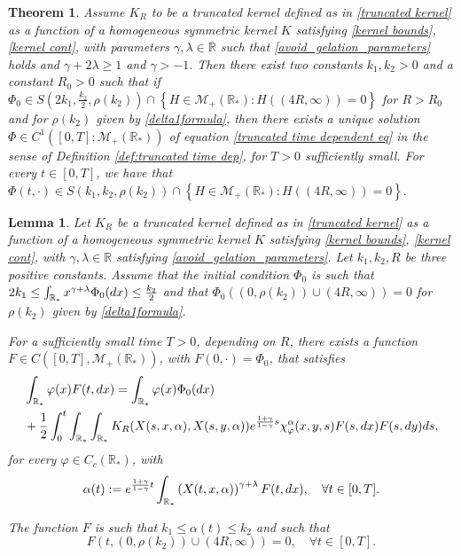 \documentclass[10pt,a4paper]{amsart}
\newtheorem{theorem}{Theorem}
\newtheorem{lemma}{Lemma}
\newcommand{\der}{\textup{d}}
\begin{document}
\begin{theorem}\label{thm:time dep truncated}
Assume $K_{R}$ to be a truncated kernel defined as in \eqref{truncated kernel} as a function of a homogeneous symmetric kernel $K$ satisfying \eqref{kernel bounds},  \eqref{kernel cont},  with parameters $\gamma, \lambda \in \mathbb R$ such that \eqref{avoid_gelation_parameters} holds and $\gamma + 2\lambda \geq 1 $ and $\gamma > -1.$ 
Then there exist two constants $k_1, k_2>0$ and a constant $R_0>0$ such that if $\Phi_{0} \in S\left(2 k_1 , \frac{k_2}{2} , \rho(k_2)\right) \cap \left\{ H \in \mathcal M_+(\mathbb R_*): H((4R, \infty) )=0 \right\} $ for $R >R_0$ and for $\rho(k_2)$ given by \eqref{delta1formula},
then there exists a unique solution $\Phi \in C^{1}([0,T];\mathcal M_{+}(\mathbb R_*))$ of equation \eqref{truncated time dependent eq} in the sense of Definition \ref{def:truncated time dep}, for $T>0$ sufficiently small.  
For every $ t \in [0, T]$, we have that $\Phi(t, \cdot ) \in S\left(k_1, k_2, \rho( k_2 )\right) \cap \left\{ H \in \mathcal M_+(\mathbb R_*): H((4R, \infty) )=0 \right\}.$ 
\end{theorem}

\begin{lemma}\label{lem:auxiliary time dep truncated} 
Let $K_R$ be a truncated kernel defined as in \eqref{truncated kernel} as a function of a homogeneous symmetric kernel $K$ satisfying \eqref{kernel bounds},  \eqref{kernel cont},  with $\gamma , \lambda \in \mathbb R$ satisfying \eqref{avoid_gelation_parameters}. 
Let $k_1, k_2, R$ be three positive constants. 
Assume that the initial condition $\Phi_0$ is such that $ 2k_1 \leq \int_{\mathbb R_*} x^{\gamma+\lambda} \Phi_0(\der x ) \leq \frac{k_2}{2}$ and that $\Phi_0((0,\rho(k_2)) \cup (4R, \infty ))=0$ for $\rho(k_2)$ given by \eqref{delta1formula}. 

For a sufficiently small time  $T>0$, depending on $R$, 
there exists a function $F \in C([0, T] , \mathcal M_{+}(\mathbb R_*))$, with  $F (0, \cdot)=\Phi_0$, that satisfies  
\begin{align} \label{eq for F}
&\int_{\mathbb R_*} \varphi(x) F(t,  \der x) =  \int_{\mathbb R_*} \varphi(x) \Phi_0( \der x)  \\
&+ \frac{1}{2} \int_0^t \int_{\mathbb R_*} \int_{\mathbb R_*} K_R(X(s,x, \alpha),X(s,y,\alpha))e^{\frac{1+\gamma}{1-\gamma}s}\chi^\alpha_{\varphi}(x,y,s)F(s,  \der x) F(s,  \der y) \der s, \nonumber
\end{align}
 for every $\varphi \in C_c(\mathbb R_*)$, with
 \begin{equation}\label{alfa}
\alpha(t):=e^{\frac{1+\gamma}{1-\gamma} t}\int_{\mathbb R_*} \left(X(t,x, \alpha)\right)^{\gamma+\lambda} F(t, \der x ), \quad \forall t \in [0,T].
 \end{equation} 

The function $F$ is such that $ k_1 \leq \alpha (t) \leq k_2$ and such that
\begin{equation} \label{support FPhi}
F(t,(0,\rho(k_2) )\cup (4R, \infty ))=0, \quad  \forall t \in[0,T].
\end{equation} 
\end{lemma}
\end{document}

